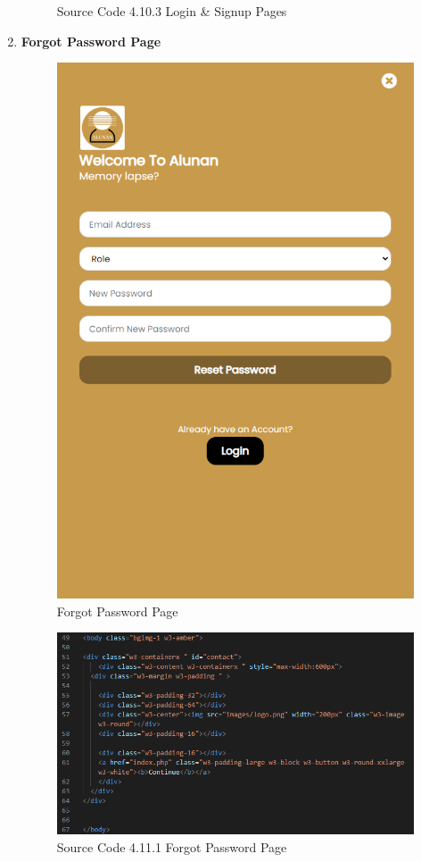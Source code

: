 \begin{enumerate}[1.]
\begin{figure}[h]
\begin{subfigure}[b]{0.7\textwidth}
            \label{fig:sub5}
        \end{subfigure}
        \caption*{Source Code 4.10.3 Login \& Signup Pages}
        \label{fig:myfig49c}
    \end{figure}

    \item \textbf{Forgot Password Page}
    \begin{figure}[h]
        \centering
        \includegraphics[width=0.5\linewidth]{mainmatter/images/frontend/ss/Forgot Password.png}
        \caption{Forgot Password Page}
        \label{fig:myfig50}
    \end{figure}
    \begin{figure}[h]
        \centering
        \includegraphics[width=0.7\linewidth]{mainmatter/images/frontend/code/frontpage.png}
        \caption*{Source Code 4.11.1 Forgot Password Page}
        \label{fig:myfig50a}
    \end{figure}


\end{enumerate}
